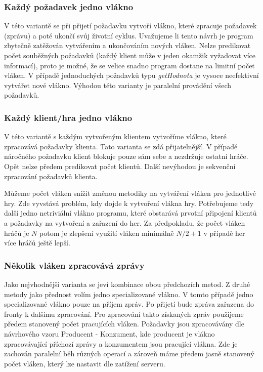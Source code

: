 \documentclass[12pt, a4paper]{article}
\begin{document}
\subsubsection{Každý požadavek jedno vlákno}
V této variantě se při přijetí požadavku vytvoří vlákno, které zpracuje požadavek (zprávu) a poté ukončí svůj životní cyklus. Uvažujeme li tento návrh je program zbytečně zatěžován vytvářením a ukončováním nových vláken. Nelze predikovat počet souběžných požadavků (každý klient může v jeden okamžik vyžadovat více informací), proto je možné, že se velice snadno program dostane na limitní počet vláken. V případě jednoduchých požadavků typu \emph{getHodnota} je vysoce neefektivní vytvářet nové vlákno. Výhodou této varianty je paralelní provádění všech požadavků.

\subsubsection{Každý klient/hra jedno vlákno}

V této variantě s každým vytvořeným klientem vytvoříme vlákno, které zpracovává požadavky klienta. Tato varianta se zdá přijatelnější. V případě náročného požadavku klient blokuje pouze sám sebe a nezdržuje ostatní hráče. Opět nelze předem predikovat počet klientů. Další nevýhodou je sekvenční zpracování požadavků klienta.

Můžeme počet vláken snížit změnou metodiky na vytváření vláken pro jednotlivé hry. Zde vyvstává problém, kdy dojde k vytvoření vlákna hry. Potřebujeme tedy další jedno netriviální vlákno programu, které obstarává prvotní připojení klientů a požadavky na vytvoření a zařazení do her. Za předpokladu, že počet vláken hráčů je $N$ potom je zlepšení využití vláken minimálně $N/2 + 1$ v případě her více hráčů ještě lepší.

\subsubsection{Několik vláken zpracovává zprávy}

Jako nejvhodnější varianta se jeví kombinace obou předchozích metod. Z druhé metody jako přednost volím jedno specializované vlákno. V tomto případě jedno specializované vlákno pouze na příjem zpráv. Po přijetí bude zpráva zařazena do fronty k dalšímu zpracování. Pro zpracování takto získaných zpráv použijeme předem stanovený počet pracujících vláken. Požadavky jsou zpracovávány dle návrhového vzoru Producent - Konzument, kde producent je vlákno zpracovávající příchozí zprávy a konzumentem jsou pracující vlákna. Zde je zachován paralelní běh různých operací a zároveň máme předem jasně stanovený počet vláken, který lze nastavit dle zatížení serveru.
\end{document}
